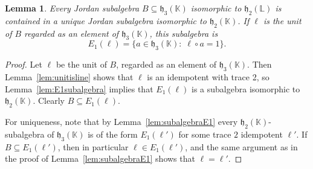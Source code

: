 \documentclass{article}
\theoremstyle{plain}
\newtheorem{lem}[thm]{Lemma}
\theoremstyle{remark}
\theoremstyle{definition}
\newcommand{\maps}{\colon}    %
\newcommand{\tr}{\operatorname{tr}}
\newcommand{\K}{{\mathbb K}}   %
\renewcommand{\L}{{\mathbb L}}   %
\newcommand{\h}{\mathfrak{h}}  %
\begin{document}
\begin{lem}
\label{lem:uniqueness}
Every Jordan subalgebra $B \subseteq \h_3(\K)$ isomorphic to $\h_2(\L)$ is contained in a unique Jordan subalgebra isomorphic to $\h_2(\K)$.   If $\ell$ is the unit of $B$ regarded as an element of $\h_3(\K)$, this subalgebra is 
\[  E_1(\ell) = \{ a \in \h_3(\K) : \; \ell \circ a = 1 \}.\]
\end{lem}

\begin{proof}
Let $\ell$ be the unit of $B$, regarded as an element of $\h_3(\K)$. Then Lemma~\ref{lem:unitisline} shows that $\ell$ is an idempotent with trace 2, so Lemma~\ref{lem:E1subalgebra} implies that $E_1(\ell)$ is a subalgebra isomorphic to $\h_2(\K)$. Clearly $B\subseteq E_1(\ell)$.

For uniqueness, note that by Lemma~\ref{lem:subalgebraE1} every $\h_2(\K)$-subalgebra of $\h_3(\K)$ is of the form $E_1(\ell')$ for some trace $2$ idempotent $\ell'$. If $B\subseteq E_1(\ell')$, then in particular $\ell\in E_1(\ell')$, and the same argument as in the proof of Lemma~\ref{lem:subalgebraE1} shows that $\ell=\ell'$.
\end{proof}

\end{document}
